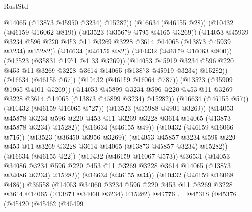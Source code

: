 \begin{lexlean}{RustStd}
\begin{coremodule}
                    @14065
                    (@13873 @45960 @3234)
                    @15282))
                (@16634 (@46155 @28))
                (@10432 (@46159 @16062 @819))
                (@13523 (@35679 @795 @4165 @3269))
                (@14053
                  @45939
                  @3234
                  @596
                  @220
                  @453
                  @11
                  @3269
                  @3228
                  @3614
                  @14065
                  (@13873 @45939 @3234)
                  @15282))
              (@16634 (@46155 @82))
              (@10432 (@46159 @16063 @800))
              (@13523 (@35831 @1971 @4133 @3269))
              (@14053
                @45919
                @3234
                @596
                @220
                @453
                @11
                @3269
                @3228
                @3614
                @14065
                (@13873 @45919 @3234)
                @15282))
            (@16634 (@46155 @67))
            (@10432 (@46159 @16064 @787))
            (@13523 (@35909 @1965 @4101 @3269))
            (@14053
              @45899
              @3234
              @596
              @220
              @453
              @11
              @3269
              @3228
              @3614
              @14065
              (@13873 @45899 @3234)
              @15282))
          (@16634 (@46155 @57))
          (@10432 (@46159 @16065 @727))
          (@13523 (@35988 @4901 @3269))
          (@14053
            @45878
            @3234
            @596
            @220
            @453
            @11
            @3269
            @3228
            @3614
            @14065
            (@13873 @45878 @3234)
            @15282))
        (@16634 (@46155 @49))
        (@10432 (@46159 @16066 @716))
        (@13523 (@36450 @3956 @3269))
        (@14053
          @45857
          @3234
          @596
          @220
          @453
          @11
          @3269
          @3228
          @3614
          @14065
          (@13873 @45857 @3234)
          @15282))
      (@16634 (@46155 @22))
      (@10432 (@46159 @16067 @573))
      @36531
      (@14053
        @34086
        @3234
        @596
        @220
        @453
        @11
        @3269
        @3228
        @3614
        @14065
        (@13873 @34086 @3234)
        @15282))
    (@16634 (@46155 @34))
    (@10432 (@46159 @16068 @486))
    @36558
    (@14053 @34060 @3234 @596 @220 @453 @11 @3269 @3228 @3614 @14065 (@13873 @34060 @3234) @15282)
@46776 := @45318
    (@45376
      (@45420
        (@45462
          (@45499

\end{coremodule}
\end{lexlean}

